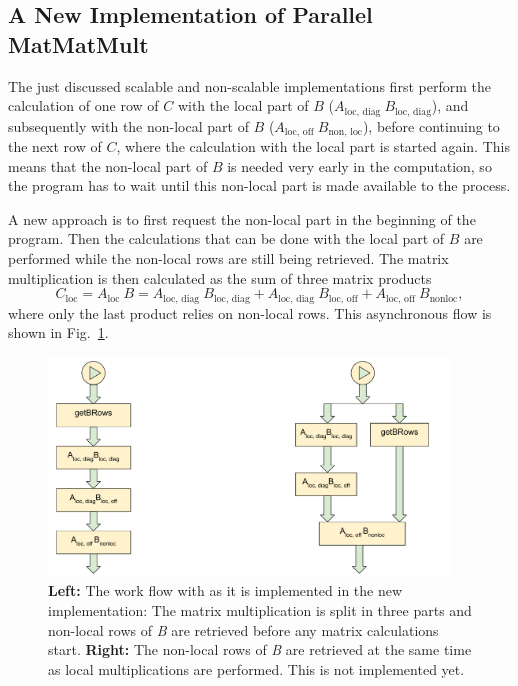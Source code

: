 \subsection{A New Implementation of Parallel MatMatMult}
\label{sec:seq_mpi}
The just discussed scalable and non-scalable implementations first perform the calculation of one row of $C$ with the local part of $B$ ($A_{\textrm{loc, diag~}} B_{\textrm{loc, diag}}$), and subsequently with the non-local part of $B$ ($A_{\textrm{loc, off~}} B_{\textrm{non, loc}}$), before continuing to the next row of $C$, where the calculation with the local part is started again. This means that the non-local part of $B$ is needed very early in the computation, so the program has to wait until this non-local part is made available to the process.

A new approach is to first request the non-local part in the beginning of the program. Then the calculations that can be done with the local part of $B$ are performed while the non-local rows are still being retrieved. The matrix multiplication is then calculated as the sum of three matrix products 
\begin{equation}
C_{\textrm{loc}} = A_{\textrm{loc~}} B = A_{\textrm{loc, diag~}} B_{\textrm{loc, diag}} + A_{\textrm{loc, diag~}} B_{\textrm{loc, off}} + A_{\textrm{loc, off~}} B_{\textrm{nonloc}},
\end{equation}
where only the last product relies on non-local rows. This asynchronous flow is shown in Fig.~\ref{fig:mpi_workflow}.

\begin{figure}[tb]
\centering
\includegraphics[width=0.95\textwidth]{mpi_workflow}
\caption{\textbf{Left:} The work flow with as it is implemented in the new implementation: The matrix multiplication is split in three parts and non-local rows of \textit{B} are retrieved before any matrix calculations start. \textbf{Right:} The non-local rows of \textit{B} are retrieved at the same time as local multiplications are performed. This is not implemented yet.}
\label{fig:mpi_workflow}
\end{figure}

